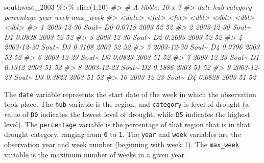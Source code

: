 \documentclass[
]{book}
\newenvironment{Shaded}{\begin{snugshade}}{\end{snugshade}}
\newcommand{\CommentTok}[1]{\textcolor[rgb]{0.56,0.35,0.01}{\textit{#1}}}
\newcommand{\DecValTok}[1]{\textcolor[rgb]{0.00,0.00,0.81}{#1}}
\newcommand{\FunctionTok}[1]{\textcolor[rgb]{0.00,0.00,0.00}{#1}}
\newcommand{\NormalTok}[1]{#1}
\newcommand{\SpecialCharTok}[1]{\textcolor[rgb]{0.00,0.00,0.00}{#1}}
\begin{document}
\begin{Shaded}
\begin{Highlighting}[]
\NormalTok{southwest\_2003 }\SpecialCharTok{\%\textgreater{}\%}
  \FunctionTok{slice}\NormalTok{(}\DecValTok{1}\SpecialCharTok{:}\DecValTok{10}\NormalTok{)}
\CommentTok{\#\textgreater{} \# A tibble: 10 x 7}
\CommentTok{\#\textgreater{}    date       hub   category percentage  year  week max\_week}
\CommentTok{\#\textgreater{}    \textless{}date\textgreater{}     \textless{}fct\textgreater{} \textless{}fct\textgreater{}         \textless{}dbl\textgreater{} \textless{}dbl\textgreater{} \textless{}dbl\textgreater{}    \textless{}dbl\textgreater{}}
\CommentTok{\#\textgreater{}  1 2003{-}12{-}30 Sout\textasciitilde{} D0           0.0718  2003    52       52}
\CommentTok{\#\textgreater{}  2 2003{-}12{-}30 Sout\textasciitilde{} D1           0.0828  2003    52       52}
\CommentTok{\#\textgreater{}  3 2003{-}12{-}30 Sout\textasciitilde{} D2           0.2693  2003    52       52}
\CommentTok{\#\textgreater{}  4 2003{-}12{-}30 Sout\textasciitilde{} D3           0.3108  2003    52       52}
\CommentTok{\#\textgreater{}  5 2003{-}12{-}30 Sout\textasciitilde{} D4           0.0796  2003    52       52}
\CommentTok{\#\textgreater{}  6 2003{-}12{-}23 Sout\textasciitilde{} D0           0.0823  2003    51       52}
\CommentTok{\#\textgreater{}  7 2003{-}12{-}23 Sout\textasciitilde{} D1           0.1312  2003    51       52}
\CommentTok{\#\textgreater{}  8 2003{-}12{-}23 Sout\textasciitilde{} D2           0.1886  2003    51       52}
\CommentTok{\#\textgreater{}  9 2003{-}12{-}23 Sout\textasciitilde{} D3           0.3822  2003    51       52}
\CommentTok{\#\textgreater{} 10 2003{-}12{-}23 Sout\textasciitilde{} D4           0.0828  2003    51       52}
\end{Highlighting}
\end{Shaded}

The \texttt{date} variable represents the start date of the week in which the observation took place. The \texttt{hub} variable is the region, and \texttt{category} is level of drought (a value of \texttt{D0} indicates the lowest level of drought, while \texttt{D5} indicates the highest level). The \texttt{percentage} variable is the percentage of that region that is in that drought category, ranging from \texttt{0} to \texttt{1}. The \texttt{year} and \texttt{week} variables are the observation year and week number (beginning with week 1). The \texttt{max\_week} variable is the maximum number of weeks in a given year.
\end{document}
